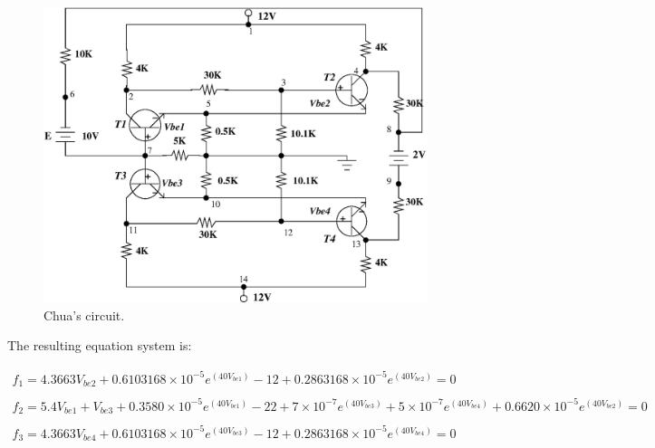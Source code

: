 \documentclass[conference,letterpaper,onecolumn]{IEEEtran}
\begin{document}
\begin{figure}[hbtp]
\centering
\includegraphics[scale=0.49]{fig/newchua.eps}
\caption{Chua's circuit.}
\label{newchua}
\end{figure}


The resulting equation system is:

{\tiny
\begin{equation}
\begin{array}{l}
f_1=4.3663V_{be2}+0.6103168 \times 10^{-5} e^{(40V_{be1})}-12 +0.2863168\times 10^{-5}e^{(40V_{be2})}=0 \\ \\
f_2=5.4V_{be1}+V_{be3}+0.3580\times 10^{-5}e^{(40V_{be1})}-22 +7\times 10^{-7}e^{(40V_{be3})}+  5\times 10^{-7}e^{(40V_{be4})}+0.6620\times 10^{-5}e^{(40V_{be2})}=0 \\ \\
f_3=4.3663V_{be4}+0.6103168\times 10^{-5}e^{(40V_{be3})}-12 +0.2863168\times 10^{-5}e^{(40V_{be4})}=0 \\
\end{array}
\end{equation}
}
\end{document}
